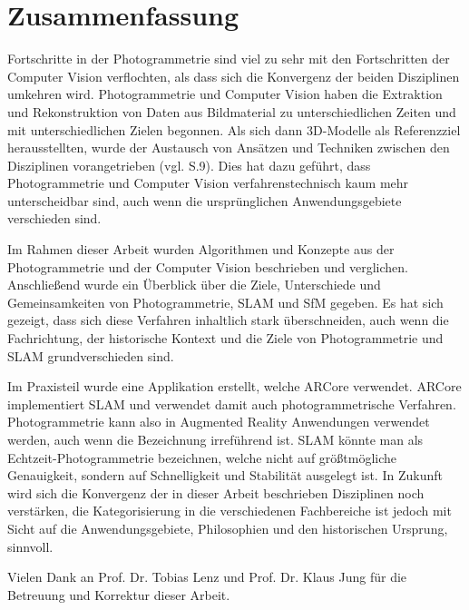 \chapter{Zusammenfassung}


Fortschritte in der Photogrammetrie sind viel zu sehr mit den Fortschritten der Computer Vision verflochten, als dass sich die Konvergenz der beiden Disziplinen umkehren wird. Photogrammetrie und Computer Vision haben die Extraktion und Rekonstruktion von Daten aus Bildmaterial zu unterschiedlichen Zeiten und mit unterschiedlichen Zielen begonnen. Als sich dann 3D-Modelle als Referenzziel herausstellten, wurde der Austausch von Ansätzen und Techniken zwischen den Disziplinen vorangetrieben (vgl. \cite{state_of_art} S.9). Dies hat dazu geführt, dass Photogrammetrie und Computer Vision verfahrenstechnisch kaum mehr unterscheidbar sind, auch wenn die ursprünglichen Anwendungsgebiete verschieden sind. 

Im Rahmen dieser Arbeit wurden Algorithmen und Konzepte aus der Photogrammetrie und der Computer Vision beschrieben und verglichen. Anschließend wurde ein Überblick über die Ziele, Unterschiede und Gemeinsamkeiten von Photogrammetrie, SLAM und SfM gegeben. Es hat sich gezeigt, dass sich diese Verfahren inhaltlich stark überschneiden, auch wenn die Fachrichtung, der historische Kontext und die Ziele von Photogrammetrie und SLAM grundverschieden sind. 

Im Praxisteil wurde eine Applikation erstellt, welche ARCore verwendet. ARCore implementiert SLAM und verwendet damit auch photogrammetrische Verfahren. Photogrammetrie kann also in Augmented Reality Anwendungen verwendet werden, auch wenn die Bezeichnung irreführend ist. SLAM könnte man als Echtzeit-Photogrammetrie bezeichnen, welche nicht auf größtmögliche Genauigkeit, sondern auf Schnelligkeit und Stabilität ausgelegt ist. In Zukunft wird sich die Konvergenz der in dieser Arbeit beschrieben Disziplinen noch verstärken, die Kategorisierung in die verschiedenen Fachbereiche ist jedoch mit Sicht auf die Anwendungsgebiete, Philosophien und den historischen Ursprung, sinnvoll.

Vielen Dank an Prof. Dr. Tobias Lenz und Prof. Dr. Klaus Jung für die Betreuung und Korrektur dieser Arbeit.
	
